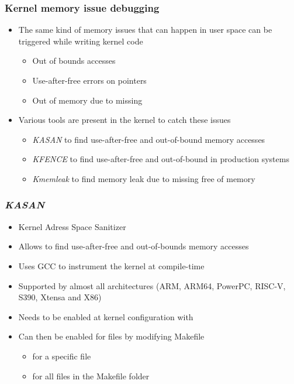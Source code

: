 \begin{frame}
  \frametitle{Kernel memory issue debugging}
  \begin{itemize}
    \item The same kind of memory issues that can happen in user space can be
          triggered while writing kernel code
    \begin{itemize}
      \item Out of bounds accesses
      \item Use-after-free errors on  pointers
      \item Out of memory due to missing 
    \end{itemize}
    \item Various tools are present in the kernel to catch these issues
    \begin{itemize}
      \item {\em KASAN} to find use-after-free and out-of-bound memory accesses
      \item {\em KFENCE} to find use-after-free and out-of-bound in production systems
      \item {\em Kmemleak} to find memory leak due to missing free of memory
    \end{itemize}
  \end{itemize}
\end{frame}

\begin{frame}
  \frametitle{{\em KASAN}}
  \begin{itemize}
    \item Kernel Adress Space Sanitizer
    \item Allows to find use-after-free and out-of-bounds memory accesses
    \item Uses GCC to instrument the kernel at compile-time
    \item Supported by almost all architectures (ARM, ARM64, PowerPC, RISC-V,
          S390, Xtensa and X86)
    \item Needs to be enabled at kernel configuration with
    \item Can then be enabled for files by modifying Makefile
    \begin{itemize}
      \item {} for a specific file
      \item {} for all files in the Makefile folder
    \end{itemize}
  \end{itemize}
\end{frame}

